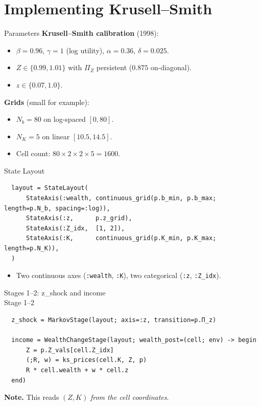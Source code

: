 \documentclass[10pt,aspectratio=169]{beamer}
\begin{document}
\section{Implementing Krusell--Smith}

\begin{frame}{Parameters}
  \textbf{Krusell--Smith calibration} (1998):
  \begin{itemize}
    \item $\beta = 0.96$, $\gamma = 1$ (log utility), $\alpha = 0.36$, $\delta = 0.025$.
    \item $Z \in \{0.99, 1.01\}$ with $\Pi_Z$ persistent ($0.875$ on-diagonal).
    \item $z \in \{0.07, 1.0\}$.
  \end{itemize}

  \textbf{Grids} (small for example):
  \begin{itemize}
    \item $N_b = 80$ on log-spaced $[0, 80]$.
    \item $N_K = 5$ on linear $[10.5, 14.5]$.
    \item Cell count: $80 \times 2 \times 2 \times 5 = 1600$.
  \end{itemize}
\end{frame}

\begin{frame}[fragile]{State Layout}
  \begin{lstlisting}
  layout = StateLayout(
      StateAxis(:wealth, continuous_grid(p.b_min, p.b_max; length=p.N_b, spacing=:log)),
      StateAxis(:z,      p.z_grid),
      StateAxis(:Z_idx,  [1, 2]),
      StateAxis(:K,      continuous_grid(p.K_min, p.K_max; length=p.N_K)),
  )
  \end{lstlisting}

  \begin{itemize}
    \item Two continuous axes (\texttt{:wealth}, \texttt{:K}), two categorical (\texttt{:z}, \texttt{:Z\_idx}).
  \end{itemize}
\end{frame}

\begin{frame}[fragile]{Stages 1--2: z\_shock and income \\ Stage 1--2}
  \begin{lstlisting}
  z_shock = MarkovStage(layout; axis=:z, transition=p.Π_z)

  income = WealthChangeStage(layout; wealth_post=(cell; env) -> begin
      Z = p.Z_vals[cell.Z_idx]
      (;R, w) = ks_prices(cell.K, Z, p)
      R * cell.wealth + w * cell.z
  end)
  \end{lstlisting}

  \textbf{Note.} This reads $(Z, K)$ \emph{from the cell coordinates}.
\end{frame}
\end{document}
